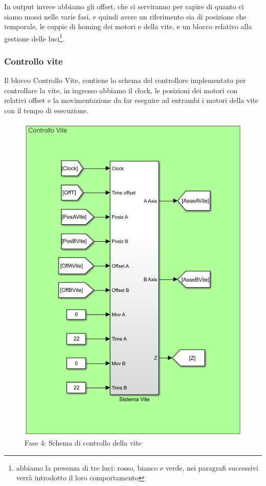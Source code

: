 In output invece abbiamo gli offset, che ci serviranno per capire di quanto ci siamo mossi nelle varie fasi, e quindi avere un riferimento sia di posizione che temporale, le coppie di homing dei motori e della vite, e un blocco relativo alla gestione delle luci\footnote{abbiamo la presenza di tre luci: rosso, bianco e verde, nei paragrafi successivi verrà introdotto il loro comportamento}.
\subsubsection*{Controllo vite}
Il blocco Controllo Vite, contiene lo schema del controllore implementato per controllare la vite, in ingresso abbiamo il clock, le posizioni dei motori con relativi offset e la movimentazione da far eseguire ad entrambi i motori della vite con il tempo di esecuzione.
\begin{figure}[ht]
	\begin{center}
		\includegraphics[scale=0.7]{Immagini/Sperimentale/ControlloViteSchema}
		\caption{Fase 4: Schema di controllo della vite}
		\label{fig:ControlloVite}
	\end{center}
\end{figure}
